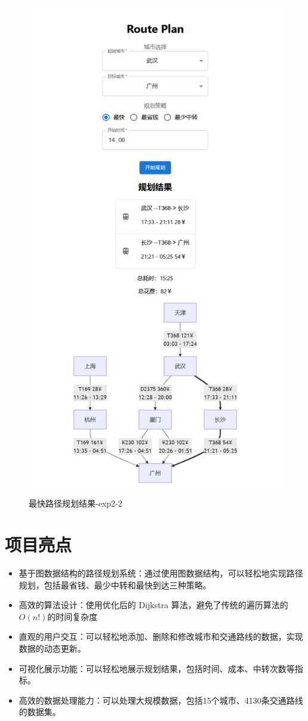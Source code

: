 \documentclass[10pt]{article}
\begin{document}
    \begin{figure}
        \centering
        \includegraphics[width=0.7\linewidth]{img/screenshot010}
        \caption{最快路径规划结果-exp2-2}
        \label{fig:screenshot010}
    \end{figure}


    \section{项目亮点}
    \begin{itemize}
        \item 基于图数据结构的路径规划系统：通过使用图数据结构，可以轻松地实现路径规划，包括最省钱、最少中转和最快到达三种策略。
        \item 高效的算法设计：使用优化后的 Dijkstra 算法，避免了传统的遍历算法的 $O(n!)$的时间复杂度
        \item 直观的用户交互：可以轻松地添加、删除和修改城市和交通路线的数据，实现数据的动态更新。
        \item 可视化展示功能：可以轻松地展示规划结果，包括时间、成本、中转次数等指标。
        \item 高效的数据处理能力：可以处理大规模数据，包括15个城市、4130条交通路线的数据集。
    \end{itemize}
\end{document}
